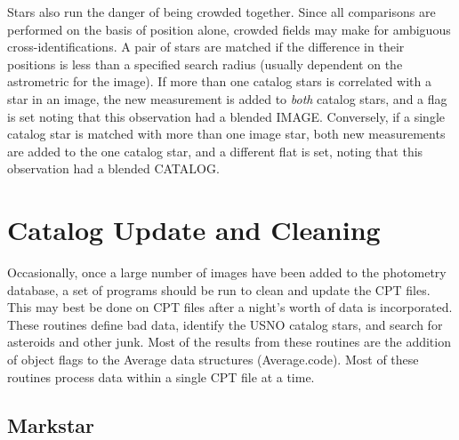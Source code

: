 \documentclass{article}
\begin{document}
Stars also run the danger of being crowded together.  Since all
comparisons are performed on the basis of position alone, crowded
fields may make for ambiguous cross-identifications.  A pair of stars
are matched if the difference in their positions is less than a
specified search radius (usually dependent on the astrometric for the
image).  If more than one catalog stars is correlated with a star in
an image, the new measurement is added to {\em both} catalog stars,
and a flag is set noting that this observation had a blended IMAGE.
Conversely, if a single catalog star is matched with more than one
image star, both new measurements are added to the one catalog star,
and a different flat is set, noting that this observation had a
blended CATALOG.   

\section{Catalog Update and Cleaning}

Occasionally, once a large number of images have been added to the
photometry database, a set of programs should be run to clean and
update the CPT files.  This may best be done on CPT files after a
night's worth of data is incorporated.  These routines define bad
data, identify the USNO catalog stars, and search for asteroids and
other junk.  Most of the results from these routines are the addition
of object flags to the Average data structures (Average.code).  Most
of these routines process data within a single CPT file at a time.

\subsection{Markstar}
\end{document}
